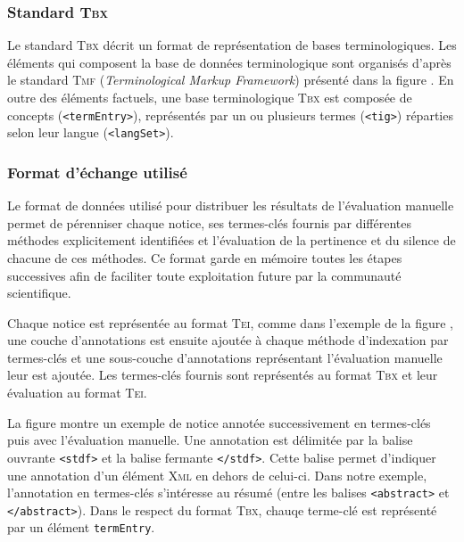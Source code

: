       \subsubsection{Standard \textsc{Tbx}}
      \label{subsubsec:main-automatic_evaluation_of_keyphrase_annotation-methodology-data_format-tbx}
        Le standard \textsc{Tbx} décrit un format de représentation de bases
        terminologiques. Les éléments qui composent la base de données
        terminologique sont organisés d'après le standard \textsc{Tmf}
        (\textit{Terminological Markup Framework}) présenté dans la figure
        . En outre des éléments
        factuels, une base terminologique \textsc{Tbx} est composée de concepts
        (\texttt{<termEntry>}), représentés par un ou plusieurs termes
        (\texttt{<tig>}) réparties selon leur langue (\texttt{<langSet>}).


      \subsubsection{Format d'échange utilisé}
      \label{subsubsec:main-automatic_evaluation_of_keyphrase_annotation-methodology-data_format-final_format}
        Le format de données utilisé pour distribuer les résultats de
        l'évaluation manuelle permet de pérenniser chaque notice, ses
        termes-clés fournis par différentes méthodes explicitement identifiées
        et l'évaluation de la pertinence et du silence de chacune de ces
        méthodes. Ce format garde en mémoire toutes les étapes successives afin
        de faciliter toute exploitation future par la communauté scientifique.

        Chaque notice est représentée au format \textsc{Tei}, comme dans
        l'exemple de la figure ,
        une couche d'annotations est ensuite ajoutée à chaque méthode
        d'indexation par termes-clés et une sous-couche d'annotations
        représentant l'évaluation manuelle leur est ajoutée. Les termes-clés
        fournis sont représentés au format \textsc{Tbx} et leur évaluation au
        format \textsc{Tei}.
        
        La figure  montre un exemple de notice annotée
        successivement en termes-clés puis avec l'évaluation manuelle. Une
        annotation est délimitée par la balise ouvrante \texttt{<stdf>} et la
        balise fermante \texttt{</stdf>}. Cette balise permet d'indiquer une
        annotation d'un élément \textsc{Xml} en dehors de celui-ci. Dans notre
        exemple, l'annotation en termes-clés s'intéresse au résumé (entre les
        balises \texttt{<abstract>} et \texttt{</abstract>}). Dans le respect du
        format \textsc{Tbx}, chauqe terme-clé est représenté par un élément
        \texttt{termEntry}. 

